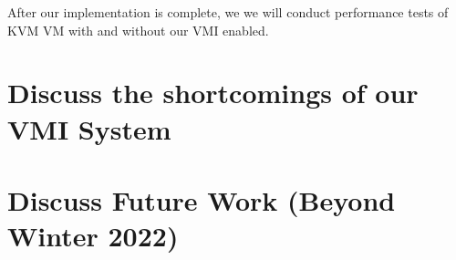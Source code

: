 \documentclass{report}
\begin{document}
\begin{spacing}{1.5}
After our implementation is complete, we we will conduct performance tests of KVM VM with and without our VMI enabled.

\section{Discuss the shortcomings of our VMI System}
\section{Discuss Future Work (Beyond Winter 2022)}




















\end{spacing}
\end{document}
